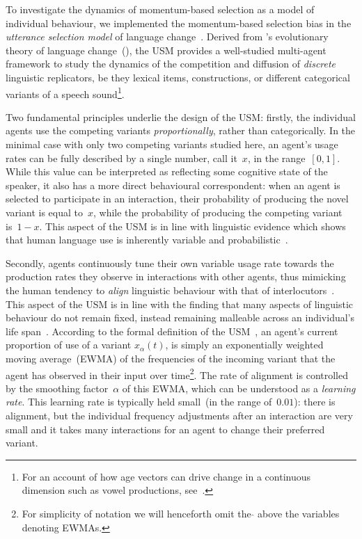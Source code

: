 To investigate the dynamics of momentum-based selection as a model of individual behaviour, we implemented the momentum-based selection bias in the \emph{utterance selection model} of language change~\citep[USM, ][]{Baxter2006,Blythe2012}. Derived from \citeauthor{Croft2000}'s evolutionary theory of language change~(\citeyear{Croft2000}), the USM provides a well-studied multi-agent framework to study the dynamics of the competition and diffusion of \emph{discrete} linguistic replicators, be they lexical items, constructions, or different categorical variants of a speech sound\footnote{For an account of how age vectors can drive change in a continuous dimension such as vowel productions, see~\citet{Swarup2012}.}.

Two fundamental principles underlie the design of the USM: firstly, the individual agents use the competing variants \emph{proportionally}, rather than categorically. In the minimal case with only two competing variants studied here, an agent's usage rates can be fully described by a single number, call it~$x$, in the range~$[0,1]$.
While this value can be interpreted as reflecting some cognitive state of the speaker, it also has a more direct behavioural correspondent: when an agent is selected to participate in an interaction, their probability of producing the novel variant is equal to~$x$, while the probability of producing the competing variant is~$1-x$. This aspect of the USM is in line with linguistic evidence which shows that human language use is inherently variable and probabilistic~\citep{Kroch1994,Labov1994,Bybee2007,Nardy2013}.

Secondly, agents continuously tune their own variable usage rate towards the production rates they observe in interactions with other agents, thus mimicking the human tendency to \emph{align} linguistic behaviour with that of interlocutors~\citep{Giles1991,Branigan2000,Jaeger2013}. This aspect of the USM is in line with the finding that many aspects of linguistic behaviour do not remain fixed, instead remaining malleable across an individual's life span~\citep{Kerswill1996,Sankoff2007,LCAS2009,Bowie2013,Stanford2014handbook}. According to the formal definition of the USM~\citep{Baxter2006}, an agent's current proportion of use of a variant $x_\alpha(t)$, is simply an exponentially weighted moving average~(EWMA) of the frequencies of the incoming variant that the agent has observed in their input over time\footnote{For simplicity of notation we will henceforth omit the $\hat{}$ above the variables denoting EWMAs.}. The rate of alignment is controlled by the smoothing factor~$\alpha$ of this EWMA, which can be understood as a \emph{learning rate}. This learning rate is typically held small~(in the range of~$0.01$): there is alignment, but the individual frequency adjustments after an interaction are very small and it takes many interactions for an agent to change their preferred variant.

